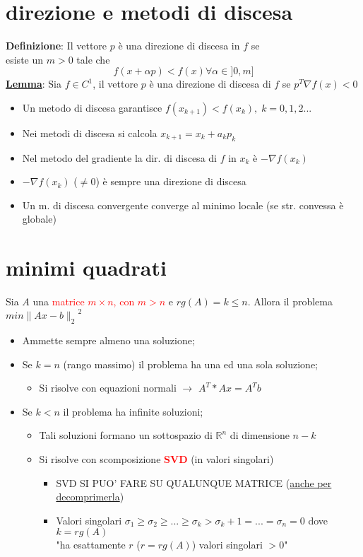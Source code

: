 \documentclass{article}
\newcommand\norm[1]{\lVert#1\rVert}	%
\begin{document}
	\section{direzione e metodi di discesa}

		\textbf{Definizione}: Il vettore $p$ è una direzione di discesa in $f$ se\\ esiste un $m > 0$ tale che
		\[
			f(x + \alpha p ) < f(x) \forall \alpha \in ] 0, m ]
		\]
		\underline{\textbf{Lemma}}: Sia $f \in C^1$, il vettore $p$ è una direzione di discesa di $f$ se \textbf{ $p^T \nabla f(x) < 0$ }
		\begin{itemize}
			\item Un metodo di discesa garantisce $f(x_{k+1}) < f(x_k), \; k = 0, 1, 2 ...$
			\item Nei metodi di discesa si calcola $x_{k+1} = x_k + a_k p_k$
			\item Nel metodo del gradiente la dir. di discesa di $f$ in $x_k$ è $ - \nabla f(x_k)$
			\item $ - \nabla f(x_k)$ ($\neq 0$) è sempre una direzione di discesa
			\item Un m. di discesa convergente converge al minimo locale (se str. convessa è globale)
		\end{itemize}

	\section{minimi quadrati}

		Sia $A$ una \textcolor{red}{matrice $m \times n$, con $m > n$} e $rg(A) = k \leq n$.
		Allora il problema $min {\norm{A x - b}_2}^2$
		\begin{itemize}
			\item Ammette sempre almeno una soluzione;
			\item Se $k = n$ (rango massimo) il problema ha una ed una sola soluzione;
			\begin{itemize}
				\item Si risolve con equazioni normali $\rightarrow$ \textbf{ $A^T * A x = A^T b$ }
			\end{itemize}
			\item Se $k < n$ il problema ha infinite soluzioni;
			\begin{itemize}
				\item Tali soluzioni formano un sottospazio di $\mathbb{R}^n$ di dimensione $n - k$
				\item Si risolve con scomposizione \textbf{\textcolor{red}{SVD}} (in valori singolari)
				\begin{itemize}
					\item SVD SI PUO' FARE SU QUALUNQUE MATRICE (\underline{anche per decomprimerla})
					\item Valori singolari $\sigma_1 \geq \sigma_2 \geq ... \geq \sigma_k > \sigma_k+1 = ... = \sigma_n = 0$ dove $k = rg(A)$ \\
					"ha esattamente $r$ ($r = rg(A)$) valori singolari $> 0$"
				\end{itemize}
			\end{itemize}
		\end{itemize}
\end{document}
